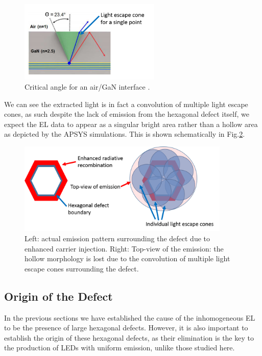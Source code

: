 \begin{figure}[h]
	\centering
	\includegraphics[width=0.6\textwidth]{Figs/Ch3/lightextraction}
	\caption[h] {Critical angle for an air/GaN interface \cite{Son2012}.}
	\label{extraction}
\end{figure}
\FloatBarrier

We can see the extracted light is in fact a convolution of multiple light escape cones, as such despite the lack of emission from the hexagonal defect itself, we expect the EL data to appear as a singular bright area rather than a hollow area as depicted by the APSYS simulations. This is shown schematically in Fig.\ref{top-view}.

\begin{figure}[h]
	\centering
	\includegraphics[width=0.9\textwidth]{Figs/Ch3/top-view}
	\caption[h] {Left: actual emission pattern surrounding the defect due to enhanced carrier injection. Right: Top-view of the emission: the hollow morphology is lost due to the convolution of multiple light escape cones surrounding the defect.}
	\label{top-view}
\end{figure}
\FloatBarrier  

\subsection{Origin of the Defect}
In the previous sections we have established the cause of the inhomogeneous EL to be the presence of large hexagonal defects. However, it is also important to establish the origin of these hexagonal defects, as their elimination is the key to the production of LEDs with uniform emission, unlike those studied here.

